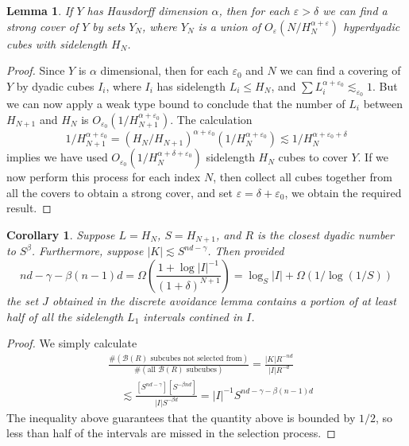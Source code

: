 \documentclass{article}
\theoremstyle{plain}
\newtheorem{lemma}{Lemma}
\newtheorem*{corollary}{Corollary}
\theoremstyle{plain}
\begin{document}
\begin{lemma}
	If $Y$ has Hausdorff dimension $\alpha$, then for each $\varepsilon > \delta$ we can find a strong cover of $Y$ by sets $Y_N$, where $Y_N$ is a union of $O_\varepsilon(N/H_N^{\alpha + \varepsilon})$ hyperdyadic cubes with sidelength $H_N$.
\end{lemma}
\begin{proof}
	Since $Y$ is $\alpha$ dimensional, then for each $\varepsilon_0$ and $N$ we can find a covering of $Y$ by dyadic cubes $I_i$, where $I_i$ has sidelength $L_i \leq H_N$, and $\sum L_i^{\alpha + \varepsilon_0} \lesssim_{\varepsilon_0} 1$. But we can now apply a weak type bound to conclude that the number of $L_i$ between $H_{N+1}$ and $H_N$ is $O_{\varepsilon_0}(1/H_{N+1}^{\alpha + \varepsilon_0})$. The calculation
	\[ 1/H_{N+1}^{\alpha + \varepsilon_0} = (H_N/H_{N+1})^{\alpha + \varepsilon_0} (1/H_N^{\alpha + \varepsilon_0}) \lesssim 1/H_N^{\alpha + \varepsilon_0 + \delta} \]
	implies we have used $O_{\varepsilon_0}(1/H_N^{\alpha + \delta + \varepsilon_0})$ sidelength $H_N$ cubes to cover $Y$. If we now perform this process for each index $N$, then collect all cubes together from all the covers to obtain a strong cover, and set $\varepsilon = \delta + \varepsilon_0$, we obtain the required result.
\end{proof}

\begin{corollary}
	Suppose $L = H_N$, $S = H_{N+1}$, and $R$ is the closest dyadic number to $S^\beta$. Furthermore, suppose $|K| \lesssim S^{nd - \gamma}$. Then provided
	\[ nd - \gamma - \beta(n-1)d = \Omega \left( \frac{ 1 + \log |I|^{-1}}{(1 + \delta)^{N+1}} \right) = \log_S |I| + \Omega(1/\log(1/S)) \]
	the set $J$ obtained in the discrete avoidance lemma contains a portion of at least half of all the sidelength $L_1$ intervals contined in $I$.
\end{corollary}

\begin{proof}
	We simply calculate
	\begin{align*}
		&\frac{\# (\text{$\mathcal{B}(R)$ subcubes not selected from})}{\# (\text{all $\mathcal{B}(R)$ subcubes})} = \frac{|K| R^{-nd}}{|I|R^{-d}}\\
		&\ \ \ \ \ \lesssim \frac{[S^{nd - \gamma}][S^{- \beta n d}]}{|I| S^{-\beta d}} = |I|^{-1} S^{nd - \gamma - \beta (n-1)d}
	\end{align*}
	The inequality above guarantees that the quantity above is bounded by $1/2$, so less than half of the intervals are missed in the selection process.
\end{proof}
\end{document}
